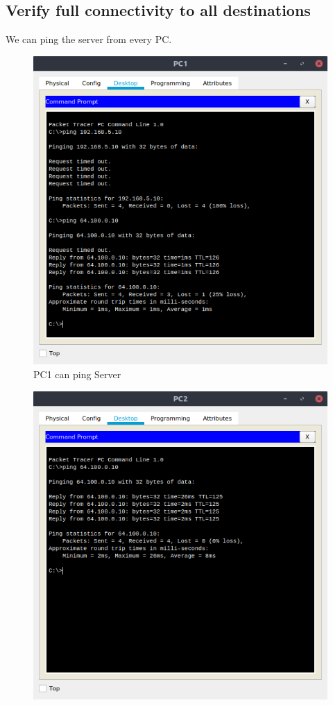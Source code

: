 \documentclass[conference]{IEEEtran}
\begin{document}
\subsection{Verify full connectivity to all destinations}
We can ping the server from every PC.
\begin{center}
\begin{figure}[h]
\includegraphics[scale=0.45]{../q03a.png}
\caption{PC1 can ping Server}
\end{figure}
\begin{figure}[h]
\includegraphics[scale=0.45]{../q03b.png}

\end{figure}
\end{center}
\end{document}
